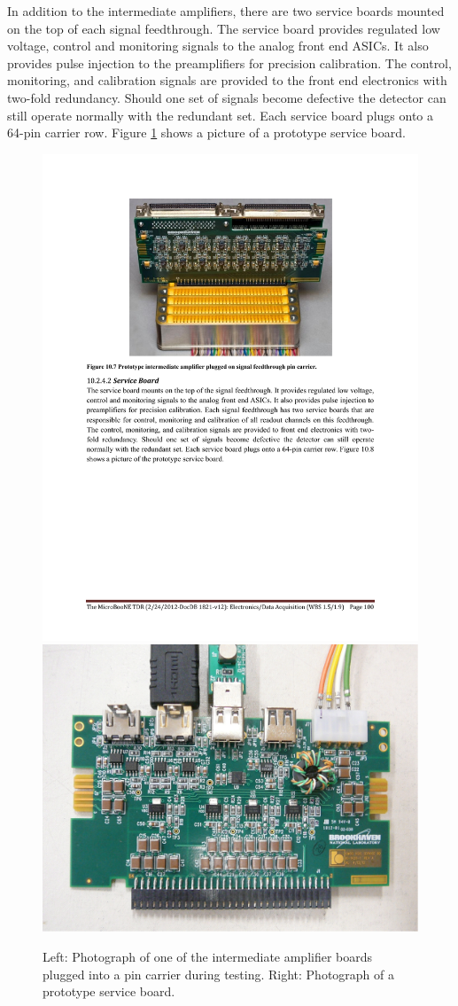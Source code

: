 In addition to the intermediate amplifiers, there are two service boards mounted on the top of each signal feedthrough. The service board provides regulated low voltage, control and monitoring signals to the analog front end ASICs. It also provides pulse injection to the preamplifiers for precision calibration. The control, monitoring, and calibration signals are provided to the front end electronics with two-fold redundancy. Should one set of signals become defective the detector can still operate normally with the redundant set. Each service board plugs onto a 64-pin carrier row. Figure \ref{fig:intermediateamplifier} shows a picture of a prototype service board.

\begin{figure}[hbt]
\begin{center}
\includegraphics[width=0.4\linewidth]{figures/intermediate_amplifier.pdf}
\includegraphics[width=0.4\linewidth]{figures/serviceboard.pdf}
\end{center}
\caption{\label{fig:intermediateamplifier}Left: Photograph of one of the intermediate amplifier boards plugged into a pin carrier during testing.  Right: Photograph of a prototype service board.}
\end{figure}


